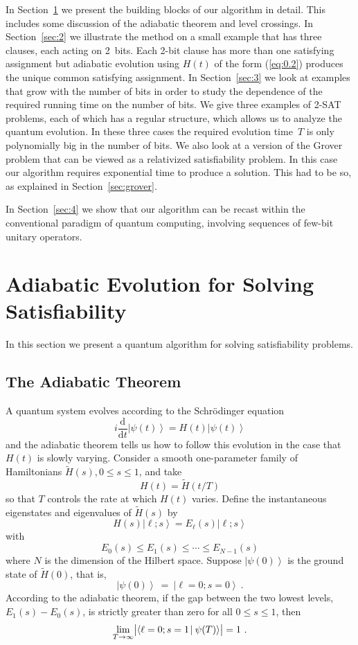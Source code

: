 \documentclass[twoside]{article}
\newcommand{\ket}[1]{\left|#1\right\rangle}
\newcommand{\braket}[2]{\left\langle{#1}\mkern-2mu
\mid \mkern-2mu{#2}
\right\rangle}
\newcommand{\braketnew}[2]{\left\langle{#1}\vphantom{#2}
\mkern2mu
 \right| \mkern1mu \left.\mkern-2mu{#2}\vphantom{#1}
\right\rangle}
\let\braket\braketnew
\newcommand{\numEq}[2]{\begin{equation}
   \label{eq:#1}
   #2\end{equation}}
\newcommand{\refEq}[1]{(\ref{eq:#1})}
\newcommand{\citeRef}[1]{\thinspace\cite{ref:#1}}
\newcommand{\rd}{\mathrm{d}}
\let\tilde\widetilde
\numberwithin{equation}{section}
\begin{document}
In Section~\ref{sec:1} we present the building blocks of our algorithm in
detail. This includes some discussion of the adiabatic theorem and level
crossings. In Section~\ref{sec:2} we illustrate the method on a small
example that has three clauses, each acting on 2~bits. Each 2-bit clause has
more than one satisfying assignment but adiabatic evolution using $H(t)$ of
the form \refEq{0.2} produces the unique common satisfying assignment. In
Section~\ref{sec:3} we look at examples that grow with the number of bits
in order to study the dependence of the required running time on the
number of bits. We give three examples of 2-SAT problems, each of which
has a regular structure, which allows us to analyze the quantum evolution.
In these three cases the required evolution time~$T$ is only polynomially
big in the number of bits. We also look at a version of the Grover problem
that can be viewed as a relativized satisfiability problem. In this case our
algorithm requires exponential time to produce a solution. This had to be so,
as explained in Section~\ref{sec:grover}.  

In Section~\ref{sec:4} we show that our algorithm can be recast within the
conventional paradigm of quantum computing, involving sequences of
few-bit unitary operators. 


\section{Adiabatic Evolution for Solving Satisfiability}\label{sec:1}
\setcounter{equation}{0}  In this section we present a quantum algorithm
for solving satisfiability problems.  
\subsection{The Adiabatic Theorem} A quantum system evolves according
to the Schr\"odinger equation
\numEq{1.1}{i  \frac{\rd} {\rd t}\ket{\psi(t)}= H(t)\ket{\psi(t)}} and the
adiabatic theorem\citeRef0 tells us how to follow this evolution in the case
that
$H(t)$ is slowly varying.  Consider a smooth one-parameter family of
Hamiltonians $\tilde{H}(s), 0\leq s\leq 1$, and take
\numEq{1.2}{H (t)= \tilde{H}(t/T)} so that $T$ controls the rate at which
$H(t)$ varies.  Define the instantaneous eigenstates and eigenvalues of
$\tilde{H}(s)$ by 
\numEq{1.3}{ H (s)\ket{\ell; s} = E_\ell(s)\ket{\ell; s} } with
\numEq{1.4}{ E_0(s)\leq E_1(s)\leq\cdots\leq E_{N-1}(s) } where $N$ is the
dimension of the Hilbert space.  Suppose $\ket{\psi(0)}$ is the ground state
of $\tilde{H}(0)$, that is,
\numEq{1.5}{
\ket{\psi (0)} \> =\>  \ket{\ell=0; s=0}\ . } According to the adiabatic
theorem, if the gap between the two lowest levels, $E_1(s)-E_0(s)$, is
strictly greater than zero for all $0\leq s\leq1$, then
\numEq{1.6}{\lim_{T \to\infty} \bigl| \braket{\ell=0; s=1}{\psi(T)}
\bigr|=1 \ .}
\end{document}

